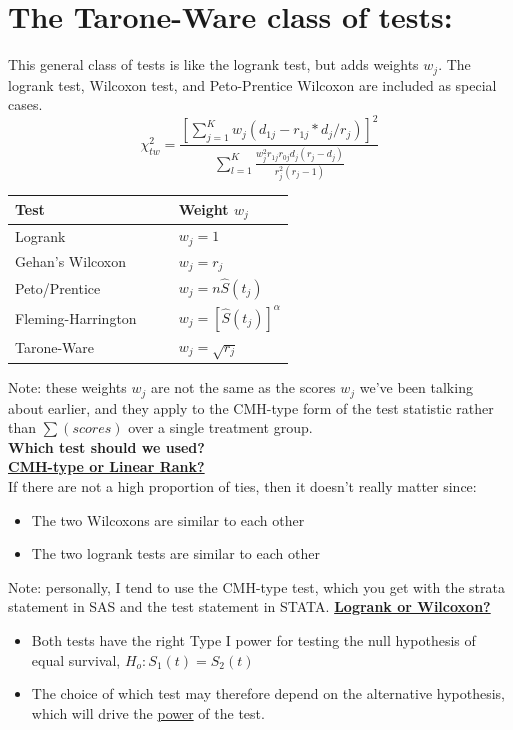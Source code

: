 \documentclass[11pt,slidesonly,semrot,portrait,palatino]{book}
\begin{document}
{\section{The Tarone-Ware class of tests:}
This general class of tests is like the logrank test, but
adds weights $w_j$.  The logrank test, Wilcoxon test, and
Peto-Prentice Wilcoxon are included as special cases.
\[ \chi^2_{tw} = \frac{[\sum_{j=1}^K w_j (d_{1j} - r_{1j}*d_j/r_j)]^2}
        {\sum_{l=1}^K \frac{w_j^2 r_{1j}r_{0j}d_j(r_j-d_j)}{r_j^2(r_j-1)}}  \]
\begin{center}
\begin{tabular}{ll}
\hline \hline
{\bf Test} & {\bf Weight $w_j$} \\ \hline
Logrank              &  $w_j = 1$\\[2ex]
Gehan's Wilcoxon     &  $w_j = r_j$\\[2ex]
Peto/Prentice        &  $w_j = n \widehat{S}(t_j)$\\[2ex]
Fleming-Harrington~~~~   &  $w_j=[\hat{S}(t_j)]^\alpha$\\[2ex]
Tarone-Ware          &  $w_j=\sqrt{r_j}$\\
\hline \hline
\end{tabular}
\end{center}
Note:  these weights $w_j$ are not the same as the scores $w_j$
we've been talking about earlier, and they apply to the CMH-type
form of the test statistic rather than $\sum (scores)$ over
a single treatment group.
\\[2ex]
{\bf Which test should we used?}
\\[2ex]
\underline{\bf CMH-type or Linear Rank?}\\
If there are not a high proportion of ties, then it doesn't
really matter since:
\begin{itemize}
\item  The two Wilcoxons are similar to each other
\item  The two logrank tests are similar to each other
\end{itemize}
{ Note: personally, I tend to use the CMH-type test, which
you get with the {\sc strata} statement in SAS and the {\sc test}
statement in STATA.}
\newpage
\underline{\bf Logrank or Wilcoxon?}
\begin{itemize}
\item Both tests have the right Type I power for testing the null
hypothesis of equal survival, $H_o: S_1(t)=S_2(t)$

\item The choice of which test may therefore depend on the alternative
hypothesis, which will drive the \underline{power} of the test.


\end{itemize}}
\end{document}
